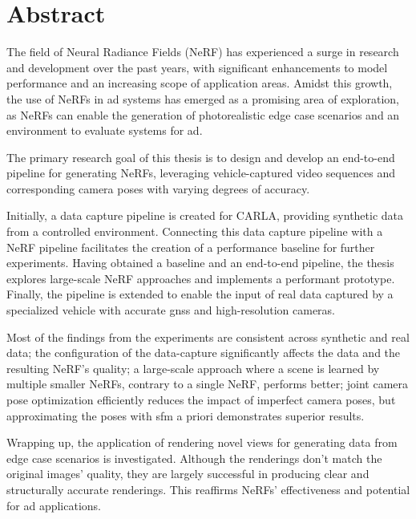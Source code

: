 \chapter*{Abstract}

The field of Neural Radiance Fields (NeRF) has experienced a surge in research and development over the past years, with significant enhancements to model performance and an increasing scope of application areas. Amidst this growth, the use of NeRFs in \acrfull{ad} systems has emerged as a promising area of exploration, as NeRFs can enable the generation of photorealistic edge case scenarios and an environment to evaluate systems for \acrshort{ad}.

The primary research goal of this thesis is to design and develop an end-to-end pipeline for generating NeRFs, leveraging vehicle-captured video sequences and corresponding camera poses with varying degrees of accuracy.

Initially, a data capture pipeline is created for CARLA, providing synthetic data from a controlled environment. Connecting this data capture pipeline with a NeRF pipeline facilitates the creation of a performance baseline for further experiments. Having obtained a baseline and an end-to-end pipeline, the thesis explores large-scale NeRF approaches and implements a performant prototype. Finally, the pipeline is extended to enable the input of real data captured by a specialized vehicle with accurate \acrfull{gnss} and high-resolution cameras.

Most of the findings from the experiments are consistent across synthetic and real data; the configuration of the data-capture significantly affects the data and the resulting NeRF's quality; a large-scale approach where a scene is learned by multiple smaller NeRFs, contrary to a single NeRF, performs better; joint camera pose optimization efficiently reduces the impact of imperfect camera poses, but approximating the poses with \acrfull{sfm} a priori demonstrates superior results.

Wrapping up, the application of rendering novel views for generating data from edge case scenarios is investigated. Although the renderings don't match the original images' quality, they are largely successful in producing clear and structurally accurate renderings. This reaffirms NeRFs' effectiveness and potential for \acrshort{ad} applications.

